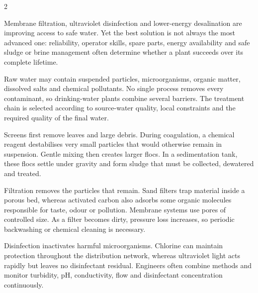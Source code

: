 

\begin{multicols}{2}
\begin{engineeringnews}
Membrane filtration, ultraviolet disinfection and lower-energy desalination are improving access to
safe water. Yet the best solution is not always the most advanced one: reliability, operator skills,
spare parts, energy availability and safe sludge or brine management often determine whether a plant
succeeds over its complete lifetime.
\end{engineeringnews}

\begin{ecarticle}
Raw water may contain suspended particles, microorganisms, organic matter, dissolved salts and
chemical pollutants. No single process removes every contaminant, so drinking-water plants combine
several barriers. The treatment chain is selected according to source-water quality, local
constraints and the required quality of the final water.

Screens first remove leaves and large debris. During coagulation, a chemical reagent destabilises
very small particles that would otherwise remain in suspension. Gentle mixing then creates larger
flocs. In a sedimentation tank, these flocs settle under gravity and form sludge that must be
collected, dewatered and treated.

Filtration removes the particles that remain. Sand filters trap material inside a porous bed,
whereas activated carbon also adsorbs some organic molecules responsible for taste, odour or
pollution. Membrane systems use pores of controlled size. As a filter becomes dirty, pressure loss
increases, so periodic backwashing or chemical cleaning is necessary.

Disinfection inactivates harmful microorganisms. Chlorine can maintain protection throughout the
distribution network, whereas ultraviolet light acts rapidly but leaves no disinfectant residual.
Engineers often combine methods and monitor turbidity, pH, conductivity, flow and disinfectant
concentration continuously.


\end{ecarticle}
\end{multicols}
